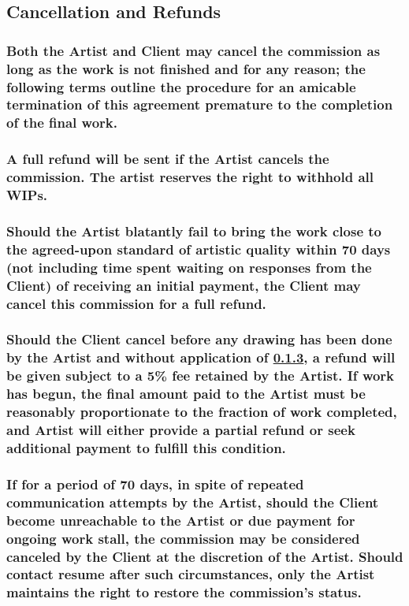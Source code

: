 \documentclass{article}
\begin{document}
\begin{flushleft}
	\leftskip=1cm
	\subsection{Cancellation and Refunds}
	\leftskip=2cm

		\subsubsection[At-will Termination]{\normalfont Both the Artist and Client may cancel the commission as long as the work is not finished and for any reason; the following terms outline the procedure for an amicable termination of this agreement premature to the completion of the final work.}
		
		\subsubsection[Cancellation by the Artist]{\normalfont A full refund will be sent if the Artist cancels the commission. The artist reserves the right to withhold all WIPs.}
		
		\subsubsection[Failure to Complete by Deadline]{\normalfont Should the Artist blatantly fail to bring the work close to the agreed-upon standard of artistic quality within 70 days (not including time spent waiting on responses from the Client) of receiving an initial payment, the Client may cancel this commission for a full refund.}\label{failuretocomplete}
		
		\subsubsection[Cancellation by the Client]{\normalfont Should the Client cancel before any drawing has been done by the Artist and without application of \ref{failuretocomplete}, a refund will be given subject to a 5\% fee retained by the Artist. If work has begun, the final amount paid to the Artist must be reasonably proportionate to the fraction of work completed, and Artist will either provide a partial refund or seek additional payment to fulfill this condition.}

		\subsubsection[Unreachable Client]{\normalfont If for a period of 70 days, in spite of repeated communication attempts by the Artist, should the Client become unreachable to the Artist or due payment for ongoing work stall, the commission may be considered canceled by the Client at the discretion of the Artist. Should contact resume after such circumstances, only the Artist maintains the right to restore the commission's status.}


\end{flushleft}
\end{document}
